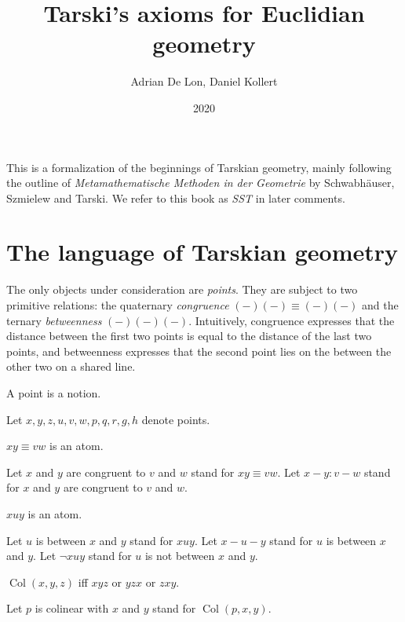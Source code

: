 \documentclass{article}
\title{Tarski's axioms for Euclidian geometry}
\author{Adrian De Lon, Daniel Kollert}
\date{2020}
\newcommand{\Cong}[4]{#1 #2 \equiv #3 #4}
\newcommand{\Betw}[3]{#1 #2 #3}
\newcommand{\NotBetw}[3]{\lnot #1 #2 #3}
\newcommand{\Col}[3]{\operatorname{Col}(#1, #2, #3)}
\begin{document}

  \maketitle

  This is a formalization of the beginnings of Tarskian geometry,
  mainly following the outline of \textit{Metamathematische Methoden in der Geometrie} by
  Schwabhäuser, Szmielew and Tarski.
  We refer to this book as \textit{SST} in later comments.


  \section{The language of Tarskian geometry}

  The only objects under consideration are \textit{points}.
  They are subject to two primitive relations:
  the quaternary \textit{congruence} $\Cong{(-)}{(-)}{(-)}{(-)}$
  and the ternary \textit{betweenness} $\Betw{(-)}{(-)}{(-)}$.
  Intuitively, congruence expresses that the distance between the first two points is equal to the distance of the last two points, and betweenness expresses that
  the second point lies on the between the other two on a shared line.


  \begin{forthel}

    \begin{signature}
      A point is a notion.
    \end{signature}

    Let $x, y, z, u, v, w, p, q, r, g, h$ denote points.


    \begin{signature}
      $\Cong{x}{y}{v}{w}$ is an atom.
    \end{signature}

    Let $x$ and $y$ are congruent to $v$ and $w$ stand for $\Cong{x}{y}{v}{w}$.
    Let $x-y : v-w$ stand for $x$ and $y$ are congruent to $v$ and $w$.

    \begin{signature}
      $\Betw{x}{u}{y}$ is an atom.
    \end{signature}

    Let $u$ is between $x$ and $y$ stand for $\Betw{x}{u}{y}$.
    Let $x-u-y$ stand for $u$ is between $x$ and $y$.
    Let $\NotBetw{x}{u}{y}$ stand for $u$ is not between $x$ and $y$.


    \begin{definition}
      $\Col{x}{y}{z}$ iff $\Betw{x}{y}{z}$ or $\Betw{y}{z}{x}$ or $\Betw{z}{x}{y}$.
    \end{definition}

    Let $p$ is colinear with $x$ and $y$ stand for $\Col{p}{x}{y}$.
  \end{forthel}
\end{document}
